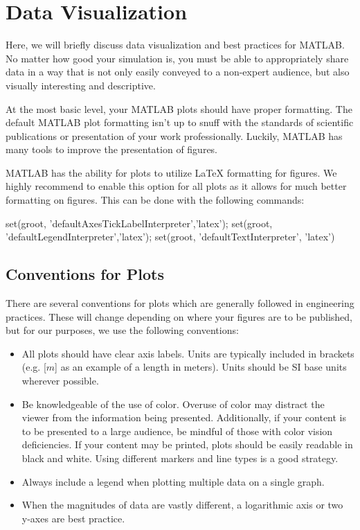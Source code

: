 \documentclass[10pt, openany, titlepage]{book}
\theoremstyle{definition}
\newcounter{example}[chapter]
\begin{document}
\section{Data Visualization}
Here, we will briefly discuss data visualization and best practices for MATLAB. No matter how good your simulation is, you must be able to appropriately share data in a way that is not only easily conveyed to a non-expert audience, but also visually interesting and descriptive.

At the most basic level, your MATLAB plots should have proper formatting. The default MATLAB plot formatting isn't up to snuff with the standards of scientific publications or presentation of your work professionally. Luckily, MATLAB has many tools to improve the presentation of figures.

MATLAB has the ability for plots to utilize LaTeX formatting for figures. We highly recommend to enable this option for all plots as it allows for much better formatting on figures. This can be done with the following commands:

\begin{matlabscript}{}
set(groot, 'defaultAxesTickLabelInterpreter','latex');
set(groot, 'defaultLegendInterpreter','latex');
set(groot, 'defaultTextInterpreter', 'latex')
\end{matlabscript}

\subsection{Conventions for Plots}
There are several conventions for plots which are generally followed in engineering practices. These will change depending on where your figures are to be published, but for our purposes, we use the following conventions:
\begin{itemize}
    \item All plots should have clear axis labels. Units are typically included in brackets (e.g. [$m$] as an example of a length in meters). Units should be SI base units wherever possible.
    \item Be knowledgeable of the use of color. Overuse of color may distract the viewer from the information being presented. Additionally, if your content is to be presented to a large audience, be mindful of those with color vision deficiencies. If your content may be printed, plots should be easily readable in black and white. Using different markers and line types is a good strategy.
    \item Always include a legend when plotting multiple data on a single graph. 
    \item When the magnitudes of data are vastly different, a logarithmic axis or two y-axes are best practice.
\end{itemize}
\end{document}
